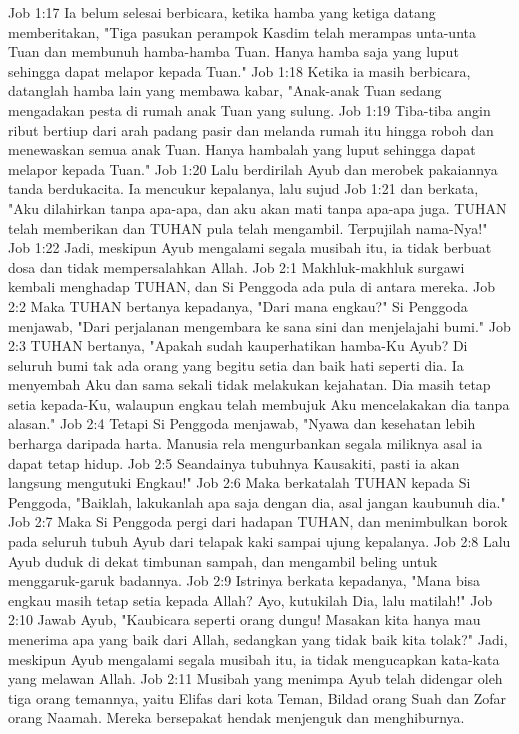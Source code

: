 Job 1:17  Ia belum selesai berbicara, ketika hamba yang ketiga datang memberitakan, "Tiga pasukan perampok Kasdim telah merampas unta-unta Tuan dan membunuh hamba-hamba Tuan. Hanya hamba saja yang luput sehingga dapat melapor kepada Tuan."
Job 1:18  Ketika ia masih berbicara, datanglah hamba lain yang membawa kabar, "Anak-anak Tuan sedang mengadakan pesta di rumah anak Tuan yang sulung.
Job 1:19  Tiba-tiba angin ribut bertiup dari arah padang pasir dan melanda rumah itu hingga roboh dan menewaskan semua anak Tuan. Hanya hambalah yang luput sehingga dapat melapor kepada Tuan."
Job 1:20  Lalu berdirilah Ayub dan merobek pakaiannya tanda berdukacita. Ia mencukur kepalanya, lalu sujud
Job 1:21  dan berkata, "Aku dilahirkan tanpa apa-apa, dan aku akan mati tanpa apa-apa juga. TUHAN telah memberikan dan TUHAN pula telah mengambil. Terpujilah nama-Nya!"
Job 1:22  Jadi, meskipun Ayub mengalami segala musibah itu, ia tidak berbuat dosa dan tidak mempersalahkan Allah.
Job 2:1  Makhluk-makhluk surgawi kembali menghadap TUHAN, dan Si Penggoda ada pula di antara mereka.
Job 2:2  Maka TUHAN bertanya kepadanya, "Dari mana engkau?" Si Penggoda menjawab, "Dari perjalanan mengembara ke sana sini dan menjelajahi bumi."
Job 2:3  TUHAN bertanya, "Apakah sudah kauperhatikan hamba-Ku Ayub? Di seluruh bumi tak ada orang yang begitu setia dan baik hati seperti dia. Ia menyembah Aku dan sama sekali tidak melakukan kejahatan. Dia masih tetap setia kepada-Ku, walaupun engkau telah membujuk Aku mencelakakan dia tanpa alasan."
Job 2:4  Tetapi Si Penggoda menjawab, "Nyawa dan kesehatan lebih berharga daripada harta. Manusia rela mengurbankan segala miliknya asal ia dapat tetap hidup.
Job 2:5  Seandainya tubuhnya Kausakiti, pasti ia akan langsung mengutuki Engkau!"
Job 2:6  Maka berkatalah TUHAN kepada Si Penggoda, "Baiklah, lakukanlah apa saja dengan dia, asal jangan kaubunuh dia."
Job 2:7  Maka Si Penggoda pergi dari hadapan TUHAN, dan menimbulkan borok pada seluruh tubuh Ayub dari telapak kaki sampai ujung kepalanya.
Job 2:8  Lalu Ayub duduk di dekat timbunan sampah, dan mengambil beling untuk menggaruk-garuk badannya.
Job 2:9  Istrinya berkata kepadanya, "Mana bisa engkau masih tetap setia kepada Allah? Ayo, kutukilah Dia, lalu matilah!"
Job 2:10  Jawab Ayub, "Kaubicara seperti orang dungu! Masakan kita hanya mau menerima apa yang baik dari Allah, sedangkan yang tidak baik kita tolak?" Jadi, meskipun Ayub mengalami segala musibah itu, ia tidak mengucapkan kata-kata yang melawan Allah.
Job 2:11  Musibah yang menimpa Ayub telah didengar oleh tiga orang temannya, yaitu Elifas dari kota Teman, Bildad orang Suah dan Zofar orang Naamah. Mereka bersepakat hendak menjenguk dan menghiburnya.
